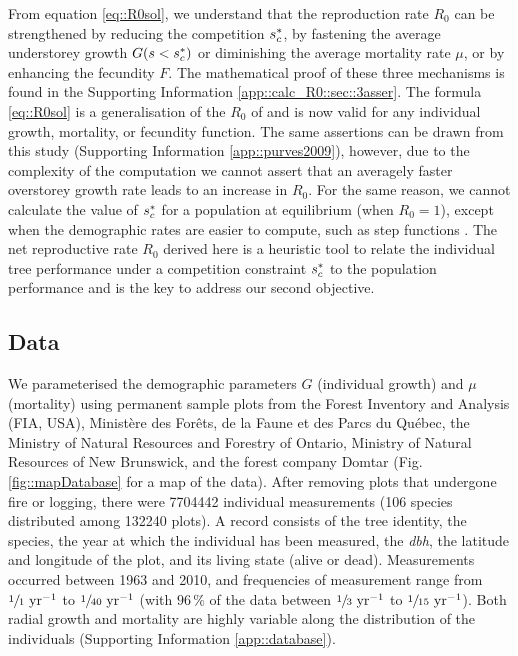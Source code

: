 From equation \eqref{eq::R0sol}, we understand that the reproduction rate $ R_0 $ can be strengthened by reducing the competition $ {s}^{*}_c $, by fastening the average understorey growth $ G(s < {s}^{*}_c) $ or diminishing the average mortality rate $ \mu $, or by enhancing the fecundity $ F $. The mathematical proof of these three mechanisms is found in the Supporting Information \ref{app::calc_R0::sec::3asser}. The formula \eqref{eq::R0sol} is a generalisation of the $ R_0 $ of \citet{Purves2009} and is now valid for any individual growth, mortality, or fecundity function. The same assertions can be drawn from this study (Supporting Information \ref{app::purves2009}), however, due to the complexity of the computation we cannot assert that an averagely faster overstorey growth rate leads to an increase in $ R_0 $. For the same reason, we cannot calculate the value of $ {s}^{*}_c $ for a population at equilibrium (\ie when $ R_0 = 1 $), except when the demographic rates are easier to compute, such as step functions \citet[Supporting Information \ref{app::purves2009} for the proof]{Purves2009}. The net reproductive rate $ R_0 $ derived here is a heuristic tool to relate the individual tree performance under a competition constraint $ {s}^{*}_c $ to the population performance and is the key to address our second objective.

\subsection{Data}
We parameterised the demographic parameters $ G $ (individual growth) and $ \mu $ (mortality) using permanent sample plots from the Forest Inventory and Analysis (FIA, USA), Ministère des Forêts, de la Faune et des Parcs du Québec, the Ministry of Natural Resources and Forestry of Ontario, Ministry of Natural Resources of New Brunswick, and the forest company Domtar (Fig. \ref{fig::mapDatabase} for a map of the data). After removing plots that undergone fire or logging, there were \num{7704442} individual measurements (106 species distributed among \num{132240} plots). A record consists of the tree identity, the species, the year at which the individual has been measured, the \textit{dbh}, the latitude and longitude of the plot, and its living state (alive or dead). Measurements occurred between 1963 and 2010, and frequencies of measurement range from $ \sfrac{1}{1} \text{ yr}^{-1} $ to $ \sfrac{1}{40} \text{ yr}^{-1} $ (with $ 96 \, \% $ of the data between $ \sfrac{1}{3} \text{ yr}^{-1} $ to $ \sfrac{1}{15} \text{ yr}^{-1} $). Both radial growth and mortality are highly variable along the distribution of the individuals (Supporting Information \ref{app::database}).

